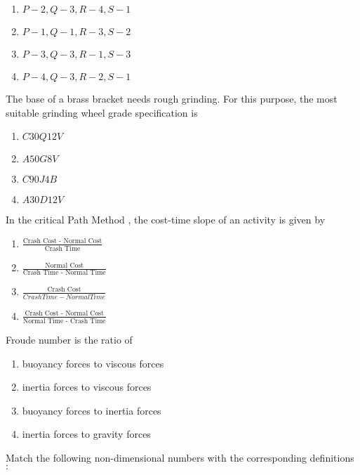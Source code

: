     \begin{enumerate}
        \item $P-2,Q-3,R-4,S-1$
        \item $P-1,Q-1,R-3,S-2$
        \item $P-3,Q-3,R-1,S-3$
        \item $P-4,Q-3,R-2,S-1$
    \end{enumerate}
    \item The base of a brass bracket needs rough grinding. For this purpose, the most suitable grinding wheel grade specification is
    \begin{enumerate}
        \item $C30Q12V$
        \item $A50G8V$
        \item $C90J4B$
        \item $A30D12V$
    \end{enumerate}
    \item In the critical Path Method , the cost-time slope of an activity is given by 
    \begin{enumerate}
        \item $\frac{\text{Crash Cost - Normal Cost}}{\text{Crash Time}}$
        \item $\frac{\text{Normal Cost}}{\text{Crash Time - Normal Time}}$
        \item $\frac{\text{Crash Cost}}{Crash Time - Normal Time}$
        \item $\frac{\text{Crash Cost - Normal Cost}}{\text{Normal Time - Crash Time}}$
    \end{enumerate}
    \item Froude number is the ratio of 
    \begin{enumerate}
        \item buoyancy forces to viscous forces 
        \item inertia forces to viscous forces
        \item buoyancy forces to inertia forces
        \item inertia forces to gravity forces
    \end{enumerate}
    \item Match the following non-dimensional numbers with the corresponding definitions $\colon$
	\begin{table}[H]    
  \centering
  
  \label{tab1.1.9.2}
\end{table}

